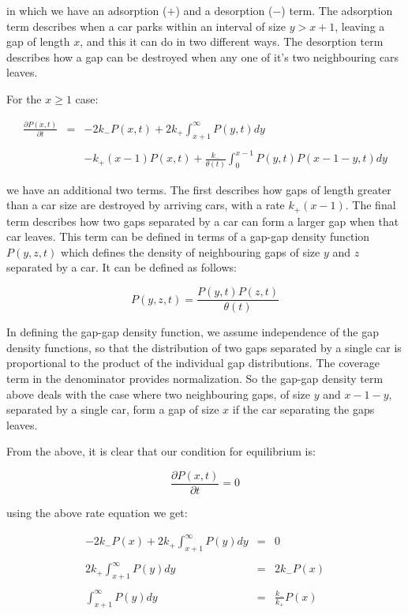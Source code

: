 in which we have an adsorption ($+$) and a desorption ($-$) term. The adsorption 
term describes when a car parks within an interval of size $y > x + 1$, leaving a 
gap of length $x$, and this it can do in two different ways. The desorption term 
describes how a gap can be destroyed when any one of it's two neighbouring cars 
leaves. \bigskip

For the $x \geq 1$ case: \bigskip

\begin{eqnarray*}
	\frac{\partial P(x, t)}{\partial t} & = & -2 k_{-} P(x, t) + 2 k_{+} \int_{x + 1}^{\infty} P(y, t) dy \\\\
										&   &  -k_{+} (x - 1) P(x, t) + \frac{k_{-}}{\theta(t)} \int_{0}^{x - 1} P(y, t) P(x - 1 - y, t) dy 
\end{eqnarray*}\medskip

we have an additional two terms. The first describes how gaps of length greater 
than a car size are destroyed by arriving cars, with a rate $k_{+} (x - 1)$. The 
final term describes how two gaps separated by a car can form a larger gap when 
that car leaves. This term can be defined in terms of a gap-gap density function 
$P(y, z, t)$ which defines the density of neighbouring gaps of size $y$ and $z$ 
separated by a car. It can be defined as follows: \bigskip

\[
	P(y, z, t) = \frac{P(y, t) P(z, t)}{\theta(t)}
\]\medskip

In defining the gap-gap density function, we assume independence of the gap density 
functions, so that the distribution of two gaps separated by a single car is 
proportional to the product of the individual gap distributions. The coverage term 
in the denominator provides normalization. So the gap-gap density term above deals 
with the case where two neighbouring gaps, of size $y$ and $x - 1 - y$, separated 
by a single car, form a gap of size $x$ if the car separating the gaps leaves. \bigskip

From the above, it is clear that our condition for equilibrium is: \bigskip

\[
	\frac{\partial P(x, t)}{\partial t} = 0
\]\medskip

using the above rate equation we get: \bigskip

\begin{eqnarray*}
	-2 k_{-} P(x) + 2 k_{+} \int_{x + 1}^{\infty} P(y) dy & = & 0 \\\\
					2 k_{+} \int_{x + 1}^{\infty} P(y) dy & = & 2 k_{-} P(x) \\\\
							\int_{x + 1}^{\infty} P(y) dy & = & \frac{k_{-}}{k_{+}} P(x)
\end{eqnarray*}\medskip

